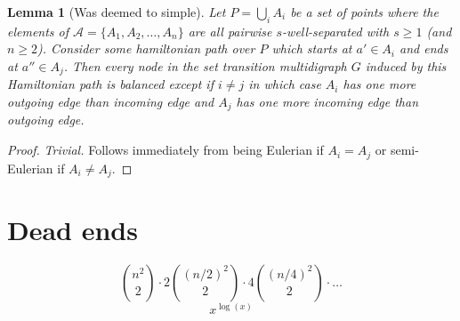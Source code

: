 \documentclass{article}
\newcommand{\PairDecomp}{\mathcal{W}}
\newtheorem{lem}[thm]{Lemma}
\theoremstyle{definition}
\newcommand{\BigLength}{\mathcal{L}}
\newcommand{\Cover}{\mathcal{C}}
\newcommand{\ACollection}{\mathcal{A}}
\newcommand{\dist}{\delta}
\begin{document}
\begin{lem}[Was deemed to simple]
    Let $P = \bigcup_i A_i$ be a set of points where the elements of $\ACollection = \{A_1, A_2, \ldots, A_n\}$ are all pairwise $s$-well-separated with $s \geq 1$ (and $n \geq 2$).
    Consider some hamiltonian path over $P$ which starts at $a' \in A_i$ and ends at $a'' \in A_j$.
    Then every node in the set transition multidigraph $G$ induced by this Hamiltonian path is balanced except if $i \neq j$ in which case $A_i$ has one more outgoing edge than incoming edge and $A_j$ has one more incoming edge than outgoing edge.
\end{lem}
\begin{proof}
    \emph{Trivial.}
    Follows immediately from being Eulerian if $A_i = A_j$ or semi-Eulerian if $A_i \neq A_j$.
\end{proof}

\section{Dead ends}

$$\binom{n^2}{2} \cdot 2 \binom{(n/2)^2}{2} \cdot 4 \binom{(n/4)^2}{2} \cdot \dots$$
$$x^{\log(x)}$$





    
\end{document}
